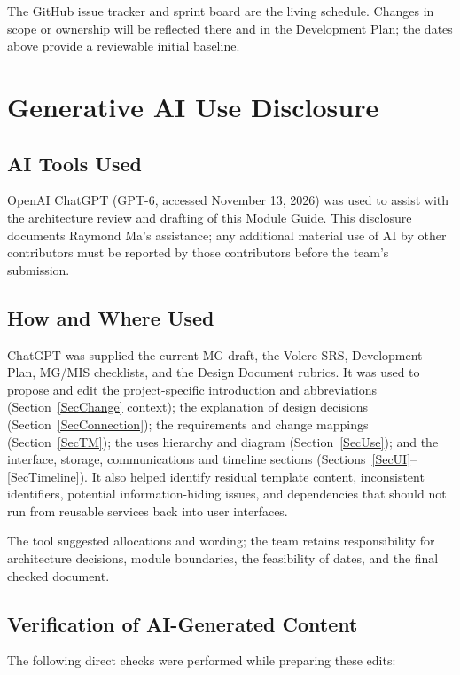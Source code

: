 \documentclass[12pt, titlepage]{article}
\begin{document}
The GitHub issue tracker and sprint board are the living schedule.
Changes in scope or ownership will be reflected there and in the
Development Plan; the dates above provide a reviewable initial baseline.

\section{Generative AI Use Disclosure} \label{SecMGDisclosure}

\subsection{AI Tools Used}

OpenAI ChatGPT (GPT-6, accessed November 13, 2026) was used to assist
with the architecture review and drafting of this Module Guide.
This disclosure documents Raymond Ma's assistance; any additional
material use of AI by other contributors must be reported by those
contributors before the team's submission.

\subsection{How and Where Used}

ChatGPT was supplied the current MG draft, the Volere SRS, Development
Plan, MG/MIS checklists, and the Design Document rubrics. It was used
to propose and edit the project-specific introduction and abbreviations
(Section~\ref{SecChange} context); the explanation of design decisions
(Section~\ref{SecConnection}); the requirements and change mappings
(Section~\ref{SecTM}); the uses hierarchy and diagram
(Section~\ref{SecUse}); and the interface, storage, communications
and timeline sections (Sections~\ref{SecUI}--\ref{SecTimeline}).
It also helped identify residual template content, inconsistent
identifiers, potential information-hiding issues, and dependencies that
should not run from reusable services back into user interfaces.

The tool suggested allocations and wording; the team retains
responsibility for architecture decisions, module boundaries, the
feasibility of dates, and the final checked document.

\subsection{Verification of AI-Generated Content}

The following direct checks were performed while preparing these edits:
\end{document}
